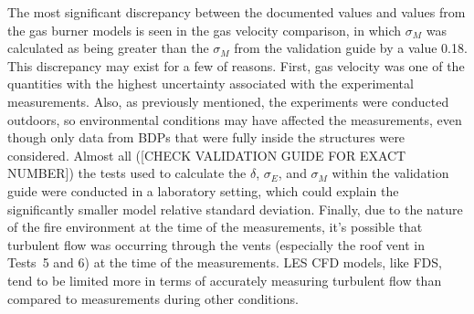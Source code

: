 The most significant discrepancy between the documented values and values from the gas burner models is seen in the gas velocity comparison, in which $\sigma_M$ was calculated as being greater than the $\sigma_M$ from the validation guide by a value 0.18. This discrepancy may exist for a few of reasons. First, gas velocity was one of the quantities with the highest uncertainty associated with the experimental measurements. Also, as previously mentioned, the experiments were conducted outdoors, so environmental conditions may have affected the measurements, even though only data from BDPs that were fully inside the structures were considered. Almost all ([CHECK VALIDATION GUIDE FOR EXACT NUMBER]) the tests used to calculate the $\delta$, $\sigma_E$, and $\sigma_M$ within the validation guide were conducted in a laboratory setting, which could explain the significantly smaller model relative standard deviation. Finally, due to the nature of the fire environment at the time of the measurements, it's possible that turbulent flow was occurring through the vents (especially the roof vent in Tests~5 and 6) at the time of the measurements. LES CFD models, like FDS, tend to be limited more in terms of accurately measuring turbulent flow than compared to measurements during other conditions.
